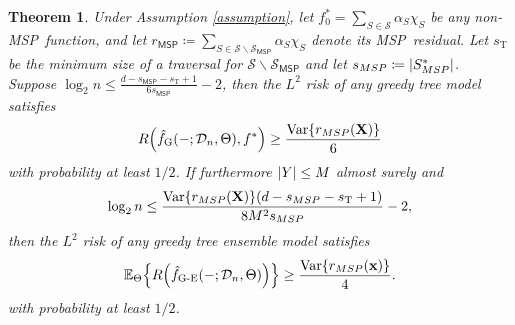 \documentclass[11pt]{article}
\newtheorem{theorem}{Theorem}[section]
\newcommand{\bx}{\mathbf{x}}
\newcommand{\bX}{\mathbf{X}}
\DeclarePairedDelimiter{\braces}{\lbrace}{\rbrace}
\DeclarePairedDelimiter{\paren}{(}{)}
\DeclarePairedDelimiter{\abs}{|}{|}
\newcommand{\E}{\mathbb{E}}
\newcommand{\Var}{\operatorname{Var}}
\newcommand{\sparsity}{s}
\newcommand{\nfeats}{d}
\newcommand{\nsamples}{n}
\newcommand{\data}[1][n]{\mathcal{D}_{#1}}
\newcommand{\MSP}{\textsf{MSP}}
\newcommand{\splitrule}{\mathcal{R}_{\textnormal{split}}}
\newcommand{\stoprule}{\mathcal{R}_{\textnormal{stop}}}
\newcommand{\suppset}{S^*}
\newcommand{\fgreedy}{\hat{f}_{\operatorname{G}}}
\newcommand{\frf}{\hat{f}_{\operatorname{RF}}}
\newcommand{\rfparam}{\Theta}
\newcommand{\monomial}{\chi}
\newcommand{\fcoefs}{\mathcal{S}}
\newcommand{\fgre}{\hat f_{\operatorname{G-E}}}
\newcommand{\ybound}{M}
\newcommand{\traversalsize}{\sparsity_{\operatorname{T}}}
\begin{document}
\begin{theorem}
\label{thm:high_prob_lower_bound}
    Under Assumption \ref{assumption}, let $f_0^* = \sum_{S \in \fcoefs} \alpha_S\monomial_S$ be any non-\MSP~function, and let $r_{\MSP} \coloneqq \sum_{S\in \fcoefs\backslash\fcoefs_{\MSP}}\alpha_S\monomial_S$ denote its \MSP~residual.
    Let $\traversalsize$ be the minimum size of a traversal for $\fcoefs\backslash\fcoefs_{\MSP}$ and let $\sparsity_{\MSP} \coloneqq \abs*{\suppset_{\MSP}}$.
    Suppose $\log_2\nsamples \leq \frac{\nfeats-s_{\MSP}-\traversalsize+1}{6s_{\MSP}} - 2$, then the $L^2$ risk of any greedy tree model satisfies
    \begin{equation}
        R\paren*{\fgreedy(-;\data,\Theta),f^*} \geq \frac{\Var\braces*{r_{\MSP}(\bX)}}{6}
    \end{equation}
    with probability at least $1/2$.
    If furthermore $\abs{Y} \leq \ybound$ almost surely and 
    \begin{equation}
        \log_2\nsamples \leq \frac{\Var\braces{r_{\MSP}(\bX)}(\nfeats-s_{\MSP}-\traversalsize+1)}{8M^2s_{\MSP}} - 2, 
    \end{equation}
    then the $L^2$ risk of any greedy tree ensemble model satisfies
    \begin{equation}
        \E_{\rfparam}\braces*{R\paren*{\fgre(-;\data,\rfparam)}} \geq \frac{\Var\braces*{r_{\MSP}(\bx)}}{4}.
    \end{equation}
    with probability at least $1/2$.
\end{theorem}


\end{document}
